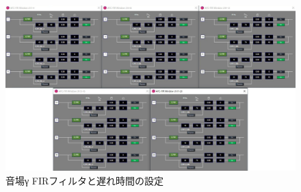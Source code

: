 \documentclass[11pt,a4j]{jreport}
\begin{document}
\begin{figure}[H]
  \centering
  \includegraphics[width=.8\linewidth]{images/experimentField/afcParameters/03gamma/02FIR.jpg}
  \caption{音場γ FIRフィルタと遅れ時間の設定}
  \label{fig:gammaFIRフィルタの設定}
\end{figure}
\end{document}
